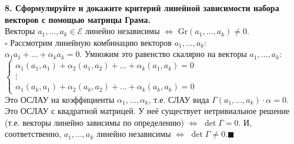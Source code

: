 \documentclass[11pt,a4paper]{article}
\newcommand{\E}{\mathcal{E}}
\newcommand{\Gr}[1]{\mathrm{Gr}\left(#1\right)}
\newcommand{\proof}{$\square$ }
\newcommand{\qed}{\hfill$\blacksquare$}
\begin{document}
\textbf{8. Сформулируйте и докажите критерий линейной зависимости набора векторов с помощью матрицы Грама.\\}
Векторы $a_1, \hdots, a_k \in \E$ линейно независимы $\Leftrightarrow$ $\Gr{a_1, \hdots, a_k} \neq 0$.\\
\proof Рассмотрим линейную комбинацию векторов $a_1, \hdots, a_k$:\\
$\alpha_1 a_1 + \hdots + \alpha_k a_k = 0$. Умножим это равенство скалярно на векторы $a_1, \hdots, a_k$:\\
$\begin{cases}
\alpha_1 (a_1, a_1) + \alpha_2 (a_1, a_2) + \hdots + \alpha_k (a_1, a_k) = 0 \\
\vdots \\
\alpha_1 (a_k, a_1) + \alpha_2 (a_k, a_2) + \hdots + \alpha_k (a_k, a_k) = 0
\end{cases}$\\
Это ОСЛАУ на коэффициенты $\alpha_1, \hdots, \alpha_k$, т.е. СЛАУ вида $\Gamma (a_1, \hdots, a_k) \cdot \alpha = 0$.\\
Это ОСЛАУ с квадратной матрицей. У неё существует нетривиальное решение (т.е. векторы линейно зависимы по определению) $\Leftrightarrow$ $\det \Gamma = 0$. И, соответственно, $a_1, \hdots, a_k$ линейно независимы $\Leftrightarrow$ $\det \Gamma \neq 0$.\qed
\end{document}
